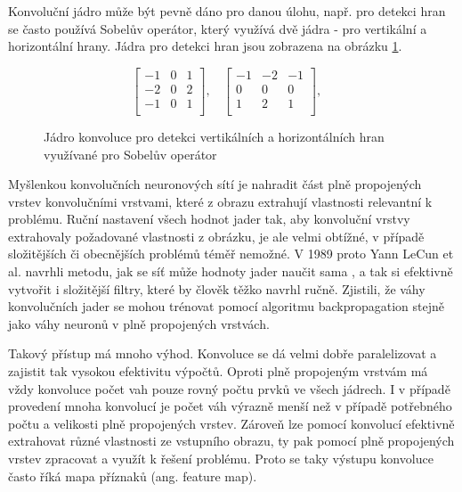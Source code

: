 Konvoluční jádro může být pevně dáno pro danou úlohu, např. pro detekci hran se
často používá Sobelův operátor, který využívá dvě jádra - pro vertikální a
horizontální hrany. Jádra pro detekci hran jsou zobrazena na obrázku
\ref{fig:sobel}.

\begin{figure}[]
    \centering
    \begin{equation*}
        {\displaystyle {
                \begin{bmatrix}
                    -1 & 0 & 1 \\
                    -2 & 0 & 2 \\
                    -1 & 0 & 1 \\
                \end{bmatrix}},\ \ \ \ }
        {\displaystyle {
                \begin{bmatrix}
                    -1 & -2 & -1 \\
                    0  & 0  & 0  \\
                    1  & 2  & 1  \\
                \end{bmatrix}},\ \ \ \ }
    \end{equation*}

    \caption{Jádro konvoluce pro detekci vertikálních a horizontálních hran využívané pro Sobelův operátor}
    \label{fig:sobel}
\end{figure}

Myšlenkou konvolučních neuronových sítí je nahradit část plně propojených
vrstev konvolučními vrstvami, které z obrazu extrahují vlastnosti relevantní k
problému. Ruční nastavení všech hodnot jader tak, aby konvoluční vrstvy
extrahovaly požadované vlastnosti z obrázku, je ale velmi obtížné, v případě
složitějších či obecnějších problémů téměř nemožné. V 1989 proto Yann LeCun et
al. navrhli metodu, jak se síť může hodnoty jader naučit sama \cite{lecun1989},
a tak si efektivně vytvořit i složitější filtry, které by člověk těžko navrhl
ručně. Zjistili, že váhy konvolučních jader se mohou trénovat pomocí algoritmu
backpropagation stejně jako váhy neuronů v plně propojených vrstvách.

Takový přístup má mnoho výhod. Konvoluce se dá velmi dobře paralelizovat a
zajistit tak vysokou efektivitu výpočtů. Oproti plně propojeným vrstvám má vždy
konvoluce počet vah pouze rovný počtu prvků ve všech jádrech. I v případě
provedení mnoha konvolucí je počet váh výrazně menší než v případě potřebného
počtu a velikosti plně propojených vrstev. Zároveň lze pomocí konvolucí
efektivně extrahovat různé vlastnosti ze vstupního obrazu, ty pak pomocí plně
propojených vrstev zpracovat a využít k řešení problému. Proto se taky výstupu
konvoluce často říká mapa příznaků (ang. feature map).

